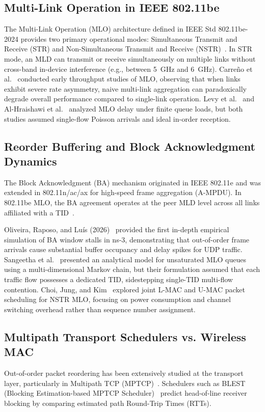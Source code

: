 \documentclass[10pt,journal,compsoc]{IEEEtran}
\begin{document}
\subsection{Multi-Link Operation in IEEE 802.11be}
The Multi-Link Operation (MLO) architecture defined in IEEE Std 802.11be-2024 provides two primary operational modes: Simultaneous Transmit and Receive (STR) and Non-Simultaneous Transmit and Receive (NSTR)~\cite{ieee80211be2024}. In STR mode, an MLD can transmit or receive simultaneously on multiple links without cross-band in-device interference (e.g., between 5~GHz and 6~GHz). Carre{\~n}o et al.~\cite{carreno2021multi} conducted early throughput studies of MLO, observing that when links exhibit severe rate asymmetry, naive multi-link aggregation can paradoxically degrade overall performance compared to single-link operation. Levy et al.~\cite{levy2022mlo} and Al-Hraishawi et al.~\cite{alhraishawi2022delay} analyzed MLO delay under finite queue loads, but both studies assumed single-flow Poisson arrivals and ideal in-order reception.

\subsection{Reorder Buffering and Block Acknowledgment Dynamics}
The Block Acknowledgment (BA) mechanism originated in IEEE 802.11e and was extended in 802.11n/ac/ax for high-speed frame aggregation (A-MPDU). In 802.11be MLO, the BA agreement operates at the peer MLD level across all links affiliated with a TID~\cite{ieee80211be2024}. 

Oliveira, Raposo, and Lu{\'{i}}s (2026)~\cite{oliveira2026characterizing} provided the first in-depth empirical simulation of BA window stalls in ns-3, demonstrating that out-of-order frame arrivals cause substantial buffer occupancy and delay spikes for UDP traffic. Sangeetha et al.~\cite{sangeetha2026performance} presented an analytical model for unsaturated MLO queues using a multi-dimensional Markov chain, but their formulation assumed that each traffic flow possesses a dedicated TID, sidestepping single-TID multi-flow contention. Choi, Jung, and Kim~\cite{choi2025joint} explored joint L-MAC and U-MAC packet scheduling for NSTR MLO, focusing on power consumption and channel switching overhead rather than sequence number assignment.

\subsection{Multipath Transport Schedulers vs. Wireless MAC}
Out-of-order packet reordering has been extensively studied at the transport layer, particularly in Multipath TCP (MPTCP)~\cite{ferlin2016blest}. Schedulers such as BLEST (Blocking Estimation-based MPTCP Scheduler)~\cite{ferlin2016blest} predict head-of-line receiver blocking by comparing estimated path Round-Trip Times (RTTs). 
\end{document}
